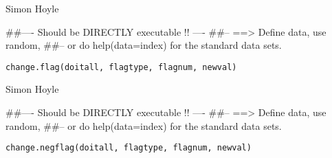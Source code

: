 \documentclass[a4paper]{book}
\begin{document}
%
\begin{Author}\relax
Simon Hoyle

\end{Author}
%
\begin{Examples}
\begin{ExampleCode}
##---- Should be DIRECTLY executable !! ----
##-- ==>  Define data, use random,
##--	or do  help(data=index)  for the standard data sets.

\end{ExampleCode}
\end{Examples}
%
\begin{Usage}
\begin{verbatim}
change.flag(doitall, flagtype, flagnum, newval)
\end{verbatim}
\end{Usage}
%
\begin{Arguments}
\begin{ldescription}
\item[\code{doitall}] 


\item[\code{flagtype}] 


\item[\code{flagnum}] 


\item[\code{newval}] 


\end{ldescription}
\end{Arguments}
%
\begin{Author}\relax

Simon Hoyle
\end{Author}
%
\begin{Examples}
\begin{ExampleCode}
##---- Should be DIRECTLY executable !! ----
##-- ==>  Define data, use random,
##--	or do  help(data=index)  for the standard data sets.

\end{ExampleCode}
\end{Examples}
%
\begin{Usage}
\begin{verbatim}
change.negflag(doitall, flagtype, flagnum, newval)
\end{verbatim}
\end{Usage}
\end{document}
